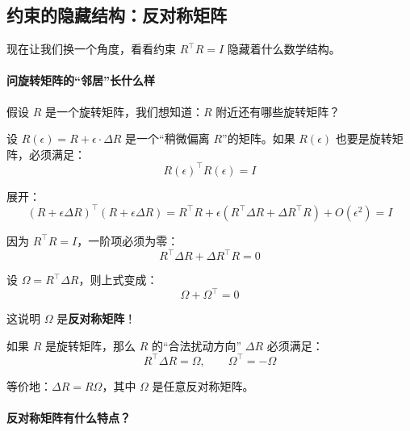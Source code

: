 \subsection*{约束的隐藏结构：反对称矩阵}

现在让我们换一个角度，看看约束 $R^\top R = I$ 隐藏着什么数学结构。

\paragraph{问旋转矩阵的“邻居”长什么样}

假设 $R$ 是一个旋转矩阵，我们想知道：$R$ 附近还有哪些旋转矩阵？

设 $R(\epsilon) = R + \epsilon \cdot \Delta R$ 是一个“稍微偏离 $R$”的矩阵。如果 $R(\epsilon)$ 也要是旋转矩阵，必须满足：
\begin{equation}
R(\epsilon)^\top R(\epsilon) = I
\end{equation}

展开：
\begin{equation}
(R + \epsilon \Delta R)^\top (R + \epsilon \Delta R) = R^\top R + \epsilon(R^\top \Delta R + \Delta R^\top R) + O(\epsilon^2) = I
\end{equation}

因为 $R^\top R = I$，一阶项必须为零：
\begin{equation}
R^\top \Delta R + \Delta R^\top R = 0
\end{equation}

设 $\Omega = R^\top \Delta R$，则上式变成：
\begin{equation}
\Omega + \Omega^\top = 0
\end{equation}

这说明 $\Omega$ 是\textbf{反对称矩阵}！

\begin{keyformula}[title=旋转矩阵的“合法扰动”]
如果 $R$ 是旋转矩阵，那么 $R$ 的“合法扰动方向” $\Delta R$ 必须满足：
\begin{equation}
R^\top \Delta R = \Omega, \qquad \Omega^\top = -\Omega
\end{equation}

等价地：$\Delta R = R \Omega$，其中 $\Omega$ 是任意反对称矩阵。
\end{keyformula}

\paragraph{反对称矩阵有什么特点？}

